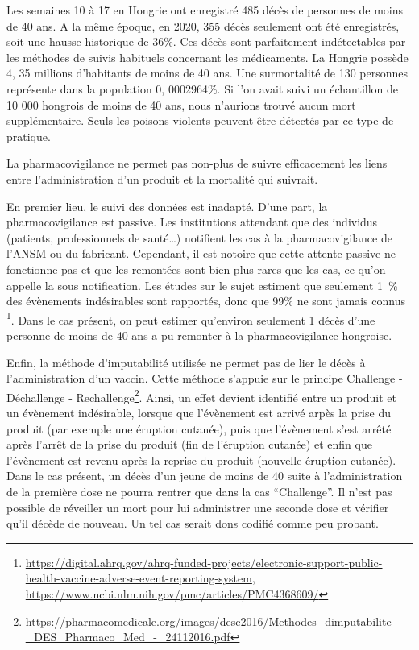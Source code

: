 \documentclass[
]{article}
\begin{document}
Les semaines 10 à 17 en Hongrie ont enregistré 485 décès de personnes de
moins de 40 ans. A la même époque, en 2020, 355 décès seulement ont été
enregistrés, soit une hausse historique de 36\%. Ces décès sont
parfaitement indétectables par les méthodes de suivis habituels
concernant les médicaments. La Hongrie possède 4, 35 millions
d'habitants de moins de 40 ans. Une surmortalité de 130 personnes
représente dans la population 0, 0002964\%. Si l'on avait suivi un
échantillon de 10 000 hongrois de moins de 40 ans, nous n'aurions trouvé
aucun mort supplémentaire. Seuls les poisons violents peuvent être
détectés par ce type de pratique.

La pharmacovigilance ne permet pas non-plus de suivre efficacement les
liens entre l'administration d'un produit et la mortalité qui suivrait.

En premier lieu, le suivi des données est inadapté. D'une part, la
pharmacovigilance est passive. Les institutions attendant que des
individus (patients, professionnels de santé\ldots) notifient les cas à
la pharmacovigilance de l'ANSM ou du fabricant. Cependant, il est
notoire que cette attente passive ne fonctionne pas et que les remontées
sont bien plus rares que les cas, ce qu'on appelle la sous notification.
Les études sur le sujet estiment que seulement 1~\% des évènements
indésirables sont rapportés, donc que 99\% ne sont jamais connus
\footnote{\url{https://digital.ahrq.gov/ahrq-funded-projects/electronic-support-public-health-vaccine-adverse-event-reporting-system},
  \url{https://www.ncbi.nlm.nih.gov/pmc/articles/PMC4368609/}}. Dans le
cas présent, on peut estimer qu'environ seulement 1 décès d'une personne
de moins de 40 ans a pu remonter à la pharmacovigilance hongroise.

Enfin, la méthode d'imputabilité utilisée ne permet pas de lier le décès
à l'administration d'un vaccin. Cette méthode s'appuie sur le principe
Challenge - Déchallenge - Rechallenge\footnote{\url{https://pharmacomedicale.org/images/desc2016/Methodes_dimputabilite_-_DES_Pharmaco_Med_-_24112016.pdf}}.
Ainsi, un effet devient identifié entre un produit et un évènement
indésirable, lorsque que l'évènement est arrivé arpès la prise du
produit (par exemple une éruption cutanée), puis que l'évènement s'est
arrêté après l'arrêt de la prise du produit (fin de l'éruption cutanée)
et enfin que l'évènement est revenu après la reprise du produit
(nouvelle éruption cutanée). Dans le cas présent, un décès d'un jeune de
moins de 40 suite à l'administration de la première dose ne pourra
rentrer que dans la cas ``Challenge''. Il n'est pas possible de
réveiller un mort pour lui administrer une seconde dose et vérifier
qu'il décède de nouveau. Un tel cas serait dons codifié comme peu
probant.
\end{document}
